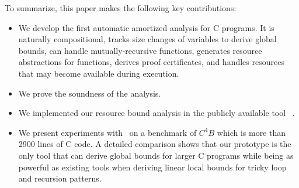 To summarize, this paper makes the following key contributions:
\vspace{-0.1cm}
\begin{itemize}
	\item We develop the first automatic amortized analysis for C programs. It is naturally compositional, tracks size changes of variables to derive global bounds, can handle mutually-recursive
	functions, generates resource abstractions for functions, derives
	proof certificates, and handles resources that may become available during execution.
	
	\item We prove the soundness of the analysis.
%	

	\item We implemented our resource bound analysis in the publicly available tool \SystemName\ .
	\item We present experiments with \SystemName\ on a benchmark of $C^{4}B$ which is more than 2900 lines of C code. A detailed comparison shows that our prototype is the only tool that can derive global bounds for larger C programs while being as powerful as existing tools when deriving linear local bounds for tricky loop and recursion patterns.
\end{itemize}





